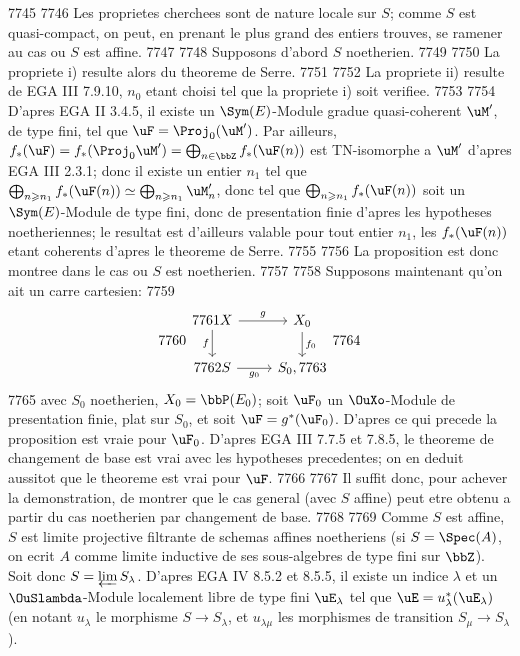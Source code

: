   7745	
  7746	Les proprietes cherchees sont de nature locale sur $S$; comme $S$ est quasi-compact, on peut, en prenant le plus grand des entiers trouves, se ramener au cas ou $S$ est affine.
  7747	
  7748	Supposons d'abord $S$ noetherien.
  7749	
  7750	La propriete i) resulte alors du theoreme de Serre.
  7751	
  7752	La propriete ii) resulte de EGA III 7.9.10, $n_0$ etant choisi tel que la propriete i) soit verifiee.
  7753	
  7754	D'apres EGA II 3.4.5, il existe un $\Sym(E)$-Module gradue quasi-coherent $\uM'$, de type fini, tel que $\uF = \Proj_0(\uM')$. Par ailleurs, $f_*(\uF) = f_*(\Proj_0 \uM') = \bigoplus_{n \in \bbZ} f_*(\uF(n))$ est TN-isomorphe a $\uM'$ d'apres EGA III 2.3.1; donc il existe un entier $n_1$ tel que $\bigoplus_{n \geqslant n_1} f_*(\uF(n)) \simeq \bigoplus_{n \geqslant n_1} \uM'_n$, donc tel que $\bigoplus_{n \geqslant n_1} f_*(\uF(n))$ soit un $\Sym(E)$-Module de type fini, donc de presentation finie d'apres les hypotheses noetheriennes; le resultat est d'ailleurs valable pour tout entier $n_1$, les $f_*(\uF(n))$ etant coherents d'apres le theoreme de Serre.
  7755	
  7756	La proposition est donc montree dans le cas ou $S$ est noetherien.
  7757	
  7758	Supposons maintenant qu'on ait un carre cartesien:
  7759	\[
  7760	\begin{tikzcd}
  7761	X \arrow[r, "g"] \arrow[d, "f"'] & X_0 \arrow[d, "f_0"] \\
  7762	S \arrow[r, "g_0"'] & S_0,
  7763	\end{tikzcd}
  7764	\]
  7765	avec $S_0$ noetherien, $X_0 = \bbP(E_0)$; soit $\uF_0$ un $\OuXo$-Module de presentation finie, plat sur $S_0$, et soit $\uF = g^*(\uF_0)$. D'apres ce qui precede la proposition est vraie pour $\uF_0$. D'apres EGA III 7.7.5 et 7.8.5, le theoreme de changement de base est vrai avec les hypotheses precedentes; on en deduit aussitot que le theoreme est vrai pour $\uF$.
  7766	
  7767	Il suffit donc, pour achever la demonstration, de montrer que le cas general (avec $S$ affine) peut etre obtenu a partir du cas noetherien par changement de base.
  7768	
  7769	Comme $S$ est affine, $S$ est limite projective filtrante de schemas affines noetheriens (si $S = \Spec(A)$, on ecrit $A$ comme limite inductive de ses sous-algebres de type fini sur $\bbZ$). Soit donc $S = \varprojlim S_\lambda$. D'apres EGA IV 8.5.2 et 8.5.5, il existe un indice $\lambda$ et un $\OuSlambda$-Module localement libre de type fini $\uE_\lambda$ tel que $\uE = u_\lambda^*(\uE_\lambda)$ (en notant $u_\lambda$ le morphisme $S \longrightarrow S_\lambda$, et $u_{\lambda\mu}$ les morphismes de transition $S_\mu \longrightarrow S_\lambda$).
